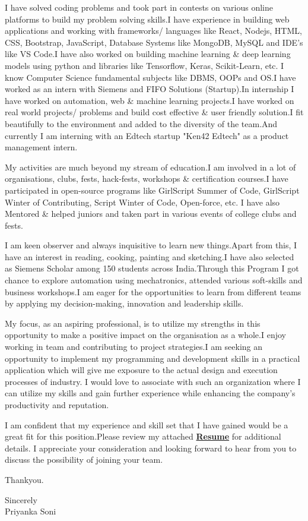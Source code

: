 \documentclass[11pt,a4]{article}
\begin{document}
I have solved coding problems and took part in contests on various online platforms to build my problem solving skills.I have experience in building web applications and working with frameworks/ languages like React, Nodejs, HTML, CSS, Bootstrap, JavaScript, Database Systems like MongoDB, MySQL and IDE's like VS Code.I have also worked on building machine learning \& deep learning models using python and libraries like Tensorflow, Keras, Scikit-Learn, etc. I know Computer Science fundamental subjects like DBMS, OOPs and OS.I have worked as an intern with Siemens and FIFO Solutions (Startup).In internship I have worked on automation, web \& machine learning projects.I have worked on real world projects/ problems and build cost effective \& user friendly solution.I fit beautifully to the environment and added to the diversity of the team.And currently I am interning with an Edtech startup "Ken42 Edtech" as a product management intern.\par

My activities are much beyond my stream of education.I am involved in a lot of organisations, clubs, fests, hack-fests, workshops \& certification courses.I have participated in open-source programs like GirlScript Summer of Code, GirlScript Winter of Contributing, Script Winter of Code, Open-force, etc. I have also Mentored \& helped juniors and taken part in various events of college clubs and fests.\par 

I am keen observer and always inquisitive to learn new things.Apart from this, I have an interest in reading, cooking, painting and sketching.I have also selected as Siemens Scholar among 150 students across India.Through this Program I got chance to explore automation using mechatronics, attended various soft-skills and business workshops.I am eager for the opportunities to learn from different teams by applying my decision-making, innovation and leadership skills.\par

My focus, as an aspiring professional, is to utilize my strengths in this opportunity to make a positive impact on the organisation as a whole.I enjoy working in team and contributing to project strategies.I am seeking an opportunity to implement my programming and development skills in a practical application which will give me exposure to the actual design and execution processes of industry. I would love to associate with such an organization where I can utilize my skills and gain further experience while enhancing the company’s productivity and reputation.\par

I am confident that my experience and skill set that I have gained would be a great fit for this position.Please review my attached \href{https://drive.google.com/file/d/1kzRAjBxObR_zcMgENjn0aBw7xcJmGxGt/view}{\textbf{Resume}} for additional details. I appreciate your consideration and looking forward to hear from you to discuss the possibility of joining your team.\par

Thankyou.

\vspace{0.5cm}
\raggedright
Sincerely \\ Priyanka Soni
\end{document}
